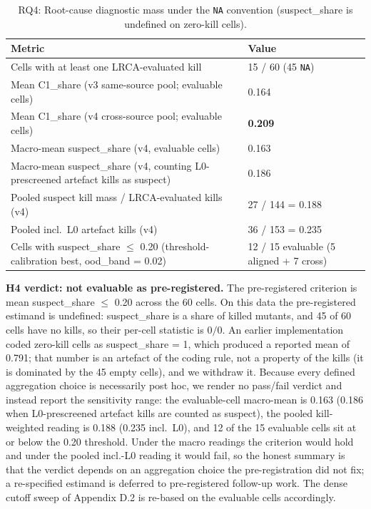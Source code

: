 \documentclass[manuscript,screen,review]{acmart}
\begin{document}
\begin{table}[t]
\caption{RQ4: Root-cause diagnostic mass under the \texttt{NA}
convention (suspect\_share is undefined on zero-kill cells).}
\label{tab:p2-13}
\centering
\small
\begin{tabular}{ll}
\toprule
Metric & Value \\
\midrule
Cells with at least one LRCA-evaluated kill & 15 / 60 (45 \texttt{NA}) \\
Mean C1\_share (v3 same-source pool; evaluable cells) & 0.164 \\
Mean C1\_share (v4 cross-source pool; evaluable cells) & \textbf{0.209} \\
Macro-mean suspect\_share (v4, evaluable cells) & 0.163 \\
Macro-mean suspect\_share (v4, counting L0-prescreened artefact kills as suspect) & 0.186 \\
Pooled suspect kill mass / LRCA-evaluated kills (v4) & 27 / 144 = 0.188 \\
Pooled incl.\ L0 artefact kills (v4) & 36 / 153 = 0.235 \\
Cells with suspect\_share $\leq$ 0.20 (threshold-calibration best, ood\_band = 0.02) & 12 / 15 evaluable (5 aligned + 7 cross) \\
\bottomrule
\end{tabular}
\end{table}

\textbf{H4 verdict: not evaluable as pre-registered.} The
pre-registered criterion is mean suspect\_share $\leq$ 0.20 across the
60 cells. On this data the pre-registered estimand is undefined:
suspect\_share is a share of killed mutants, and 45 of 60 cells have no
kills, so their per-cell statistic is $0/0$. An earlier implementation
coded zero-kill cells as suspect\_share = 1, which produced a reported
mean of 0.791; that number is an artefact of the coding rule, not a
property of the kills (it is dominated by the 45 empty cells), and we
withdraw it. Because every defined aggregation choice is necessarily
post hoc, we render no pass/fail verdict and instead report the
sensitivity range: the evaluable-cell macro-mean is 0.163 (0.186 when
L0-prescreened artefact kills are counted as suspect), the pooled
kill-weighted reading is 0.188 (0.235 incl.\ L0), and 12 of the 15
evaluable cells sit at or below the 0.20 threshold. Under the macro
readings the criterion would hold and under the pooled incl.-L0 reading
it would fail, so the honest summary is that the verdict depends on an
aggregation choice the pre-registration did not fix; a re-specified
estimand is deferred to pre-registered follow-up work. The dense cutoff
sweep of Appendix D.2 is re-based on the evaluable cells accordingly.
\end{document}
